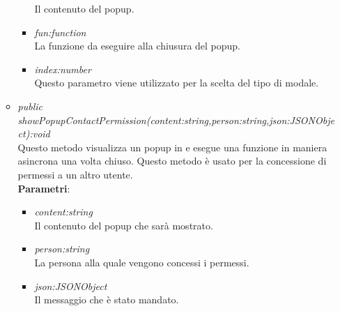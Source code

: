 \begin{itemize}
\begin{itemize}
\begin{itemize}
				Il contenuto del popup.
				\item \textit{fun:function}\\
				La funzione da eseguire alla chiusura del popup.
				\item \textit{index:number}\\
				Questo parametro viene utilizzato per la scelta del tipo di modale.
			\end{itemize}
	\item \textit{public showPopupContactPermission(content:string,person:string,json:JSONObject):void}\\
	Questo metodo visualizza un popup in  e esegue una funzione in maniera asincrona una volta chiuso. Questo metodo è usato per la concessione di permessi a un altro utente.
			\\ \textbf{Parametri}: \begin{itemize}
				\item \textit{content:string}\\
				Il contenuto del popup che sarà mostrato.
				\item \textit{person:string}\\
				La persona alla quale vengono concessi i permessi.
				\item \textit{json:JSONObject}\\
				Il messaggio che è stato mandato.
			\end{itemize}
	\end{itemize}
\end{itemize}